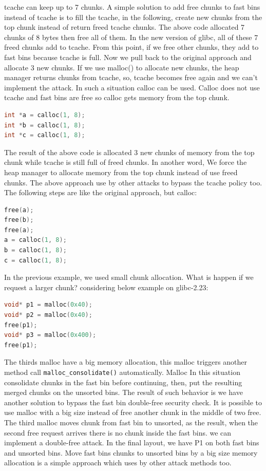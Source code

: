 \documentclass{masterthesis}
\newcommand*\libc{glibc}
\newcommand*\tch{tcache}
\newcommand*\fb{fast bins}
\newcommand*\ub{unsorted bins}
\begin{document}
\tch{} can keep up to 7 chunks. A simple solution to add free chunks to \fb{} instead of \tch{} is to fill the \tch{}, in the following, create new chunks from the top chunk instead of return freed \tch{} chunks. The above code allocated 7 chunks of 8 bytes then free all of them. In the new version of \libc{}, all of these 7 freed chunks add to \tch{}. From this point, if we free other chunks, they add to \fb{} because \tch{} is full. Now we pull back to the original approach and allocate 3 new chunks. If we use malloc() to allocate new chunks, the heap manager returns chunks from \tch{}, so, \tch{} becomes free again and we can’t implement the attack. In such a situation calloc can be used. Calloc does not use \tch{} and \fb{} are free so calloc gets memory from the top chunk. 

\begin{lstlisting}[language=c,frame=tlrb]
int *a = calloc(1, 8);
int *b = calloc(1, 8);
int *c = calloc(1, 8);
\end{lstlisting}

The result of the above code is allocated 3 new chunks of memory from the top chunk while \tch{} is still full of freed chunks. In another word, We force the heap manager to allocate memory from the top chunk instead of use freed chunks. The above approach use by other attacks to bypass the \tch{} policy too. The following steps are like the original approach, but calloc:

\begin{lstlisting}[language=c,frame=tlrb]
free(a);
free(b);
free(a);
a = calloc(1, 8);
b = calloc(1, 8);
c = calloc(1, 8);
\end{lstlisting}

In the previous example, we used small chunk allocation. What is happen if we request a larger chunk? considering below example on \libc{-2.23}:

\begin{lstlisting}[language=c,frame=tlrb]
void* p1 = malloc(0x40);
void* p2 = malloc(0x40);
free(p1);
void* p3 = malloc(0x400);
free(p1);
\end{lstlisting}

The thirds malloc have a big memory allocation, this malloc triggers another method call \lstinline{malloc_consolidate()} automatically. Malloc In this situation consolidate chunks in the fast bin before continuing, then, put the resulting merged chunks on the \ub{}.
The result of such behavior is we have another solution to bypass the fast bin double-free security check. It is possible to use malloc with a big size instead of free another chunk in the middle of two free. The third malloc moves chunk from fast bin to unsorted, as the result, when the second free request arrives there is no chunk inside the \fb{}. we can implement a double-free attack. In the final layout, we have P1 on both \fb{} and \ub{}. Move \fb{} chunks to \ub{} by a big size memory allocation is a simple approach which uses by other attack methods too.
\end{document}
